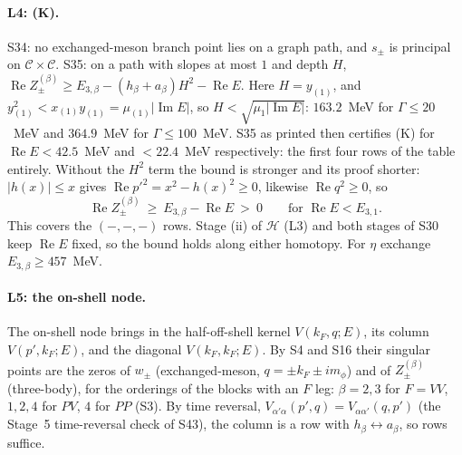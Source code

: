 \documentclass[11pt]{article}
\begin{document}
\paragraph{L4: (K).} S34: no exchanged-meson branch point lies on a graph path, and $s_\pm$ is principal on $\mathcal C\times\mathcal C$. S35: on a path with slopes at most $1$ and depth $H$, $\operatorname{Re}Z^{(\beta)}_\pm\ge E_{3,\beta}-(h_\beta+a_\beta)H^2-\operatorname{Re}E$. Here $H=y_{(1)}$, and $y_{(1)}^2<x_{(1)}y_{(1)}=\mu_{(1)}|\operatorname{Im}E|$, so $H<\sqrt{\mu_1|\operatorname{Im}E|}$: $163.2$~MeV for $\Gamma\le20$~MeV and $364.9$~MeV for $\Gamma\le100$~MeV. S35 as printed then certifies (K) for $\operatorname{Re}E<42.5$~MeV and $<22.4$~MeV respectively: the first four rows of the table entirely. Without the $H^2$ term the bound is stronger and its proof shorter: $|h(x)|\le x$ gives $\operatorname{Re}p'^2=x^2-h(x)^2\ge0$, likewise $\operatorname{Re}q^2\ge0$, so
\[
\operatorname{Re}Z^{(\beta)}_\pm\ \ge\ E_{3,\beta}-\operatorname{Re}E\ >\ 0\qquad\text{for }\operatorname{Re}E<E_{3,1}.
\]
This covers the $(-,-,-)$ rows. Stage (ii) of $\mathcal H$ (L3) and both stages of S30 keep $\operatorname{Re}E$ fixed, so the bound holds along either homotopy. For $\eta$ exchange $E_{3,\beta}\ge457$~MeV.

\paragraph{L5: the on-shell node.} The on-shell node brings in the half-off-shell kernel $V(k_F,q;E)$, its column $V(p',k_F;E)$, and the diagonal $V(k_F,k_F;E)$. By S4 and S16 their singular points are the zeros of $w_\pm$ (exchanged-meson, $q=\pm k_F\pm im_\phi$) and of $Z^{(\beta)}_\pm$ (three-body), for the orderings of the blocks with an $F$ leg: $\beta=2,3$ for $F=VV$, $1,2,4$ for $PV$, $4$ for $PP$ (S3). By time reversal, $V_{\alpha'\alpha}(p',q)=V_{\alpha\alpha'}(q,p')$ (the Stage~5 time-reversal check of S43), the column is a row with $h_\beta\leftrightarrow a_\beta$, so rows suffice.
\end{document}
